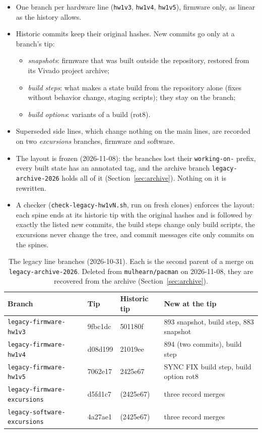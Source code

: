 \documentclass[11pt]{article}
\newcommand{\br}[1]{\texttt{#1}}
\newcommand{\h}[1]{\texttt{#1}}
\begin{document}
\begin{itemize}
\item One branch per hardware line (\br{hw1v3}, \br{hw1v4}, \br{hw1v5}), firmware only, as linear as the history
  allows.
\item Historic commits keep their original hashes.  New commits go only at a branch's tip:
  \begin{itemize}
  \item \emph{snapshots}: firmware that was built outside the repository, restored from its Vivado project archive;
  \item \emph{build steps}: what makes a state build from the repository alone (fixes without behavior change,
    staging scripts); they stay on the branch;
  \item \emph{build options}: variants of a build (rot8).
  \end{itemize}
\item Superseded side lines, which change nothing on the main lines, are recorded on two \emph{excursions}
  branches, firmware and software.
\item The layout is frozen (2026-11-08):  the branches lost their \br{working-on-} prefix, every built state has an
  annotated tag, and the archive branch \br{legacy-archive-2026} holds all of it (Section~\ref{sec:archive}).
  Nothing on it is rewritten.
\item A checker (\h{check-legacy-hw1vN.sh}, run on fresh clones) enforces the layout: each spine ends at its
  historic tip with the original hashes and is followed by exactly the listed new commits, the build steps change
  only build scripts, the excursions never change the tree, and commit messages cite only commits on the spines.
\end{itemize}

\begin{table}[h]
\centering\small
\begin{tabularx}{\textwidth}{@{}lllL@{}}
\toprule
Branch & Tip & Historic tip & New at the tip \\
\midrule
\br{legacy-firmware-hw1v3} & 9fbc1dc & 501180f & 893 snapshot, build step, 883 snapshot \\
\br{legacy-firmware-hw1v4} & d08d199 & 21019ee & 894 (two commits), build step \\
\br{legacy-firmware-hw1v5} & 7062e17 & 2425e67 & SYNC FIX build step, build option rot8 \\
\br{legacy-firmware-excursions} & d5fd1c7 & (2425e67) & three record merges \\
\br{legacy-software-excursions} & 4a27ae1 & (2425e67) & three record merges \\
\bottomrule
\end{tabularx}
\caption{The legacy line branches (2026-10-31).  Each is the second parent of a merge on
\br{legacy-archive-2026}.  Deleted from \h{mulhearn/pacman} on 2026-11-08, they are recovered from the archive
(Section~\ref{sec:archive}).}
\end{table}
\end{document}
